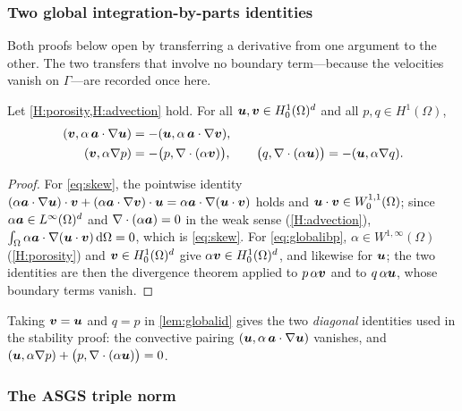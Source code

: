 \subsubsection{Two global integration-by-parts identities}

Both proofs below open by transferring a derivative from one argument to the other. The two
transfers that involve no boundary term---because the velocities vanish on $\Gamma$---are
recorded once here.

\begin{lemma}\label{lem:globalid}
Let \cref{H:porosity,H:advection} hold. For all $\boldsymbol{u},\boldsymbol{v}\in H^1_0(\Omega)^d$ and all
$p,q\in H^1(\Omega)$,
\begin{align}
  (\boldsymbol{v},\alpha\,\boldsymbol{a}\cdot\nabla\boldsymbol{u}) &= -(\boldsymbol{u},\alpha\,\boldsymbol{a}\cdot\nabla\boldsymbol{v}), \label{eq:skew}\\
  (\boldsymbol{v},\alpha\nabla p) &= -\bigl(p,\nabla\cdot(\alpha\boldsymbol{v})\bigr),
  \qquad
  \bigl(q,\nabla\cdot(\alpha\boldsymbol{u})\bigr) = -(\boldsymbol{u},\alpha\nabla q). \label{eq:globalibp}
\end{align}
\end{lemma}

\begin{proof}
For \eqref{eq:skew}, the pointwise identity
$(\alpha\boldsymbol{a}\cdot\nabla\boldsymbol{u})\cdot\boldsymbol{v}+(\alpha\boldsymbol{a}\cdot\nabla\boldsymbol{v})\cdot\boldsymbol{u}
=\alpha\boldsymbol{a}\cdot\nabla(\boldsymbol{u}\cdot\boldsymbol{v})$ holds and $\boldsymbol{u}\cdot\boldsymbol{v}\in W^{1,1}_0(\Omega)$; since
$\alpha\boldsymbol{a}\in L^\infty(\Omega)^d$ and $\nabla\cdot(\alpha\boldsymbol{a})=0$ in the weak sense
(\cref{H:advection}), $\int_\Omega\alpha\boldsymbol{a}\cdot\nabla(\boldsymbol{u}\cdot\boldsymbol{v})\,\mathrm{d}\Omega=0$, which is
\eqref{eq:skew}. For \eqref{eq:globalibp}, $\alpha\in W^{1,\infty}(\Omega)$
(\cref{H:porosity}) and $\boldsymbol{v}\in H^1_0(\Omega)^d$ give $\alpha\boldsymbol{v}\in H^1_0(\Omega)^d$, and
likewise for $\boldsymbol{u}$; the two identities are then the divergence theorem applied to
$p\,\alpha\boldsymbol{v}$ and to $q\,\alpha\boldsymbol{u}$, whose boundary terms vanish.
\end{proof}

\noindent Taking $\boldsymbol{v}=\boldsymbol{u}$ and $q=p$ in \cref{lem:globalid} gives the two \emph{diagonal}
identities used in the stability proof: the convective pairing $(\boldsymbol{u},\alpha\,\boldsymbol{a}\cdot\nabla\boldsymbol{u})$
vanishes, and $(\boldsymbol{u},\alpha\nabla p)+\bigl(p,\nabla\cdot(\alpha\boldsymbol{u})\bigr)=0$.

\subsubsection{The ASGS triple norm}\label{sec:norm}


